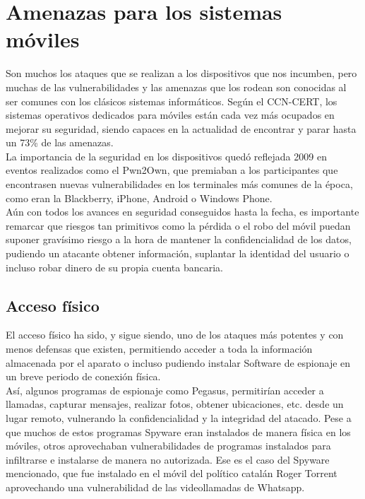 \documentclass[11pt]{article}
\begin{document}
\section{Amenazas para los sistemas móviles}

{Son muchos los ataques que se realizan a los dispositivos que nos incumben, pero muchas de las vulnerabilidades y las amenazas que los rodean son conocidas al ser comunes con los clásicos sistemas informáticos. Según el CCN-CERT, los sistemas operativos dedicados para móviles están cada vez más ocupados en mejorar su seguridad, siendo capaces en la actualidad de encontrar y parar hasta un 73\% de las amenazas.} \\

{La importancia de la seguridad en los dispositivos quedó reflejada 2009 en eventos realizados como el Pwn2Own, que premiaban a los participantes que encontrasen nuevas vulnerabilidades en los terminales más comunes de la época, como eran la Blackberry, iPhone, Android o Windows Phone.} \\

{Aún con todos los avances en seguridad conseguidos hasta la fecha, es importante remarcar que riesgos tan primitivos como la pérdida o el robo del móvil puedan suponer gravísimo riesgo a la hora de mantener la confidencialidad de los datos, pudiendo un atacante obtener información, suplantar la identidad del usuario o incluso robar dinero de su propia cuenta bancaria.}

\subsection{Acceso físico}

{El acceso físico ha sido, y sigue siendo, uno de los ataques más potentes y con menos defensas que existen, permitiendo acceder a toda la información almacenada por el aparato o incluso pudiendo instalar Software de espionaje en un breve periodo de conexión física.} \\

{Así, algunos programas de espionaje como Pegasus, permitirían acceder a llamadas, capturar mensajes, realizar fotos, obtener ubicaciones, etc. desde un lugar remoto, vulnerando la confidencialidad y la integridad del atacado. Pese a que muchos de estos programas Spyware eran instalados de manera física en los móviles, otros aprovechaban vulnerabilidades de programas instalados para infiltrarse e instalarse de manera no autorizada. Ese es el caso del Spyware mencionado, que fue instalado en el móvil del político catalán Roger Torrent aprovechando una vulnerabilidad de las videollamadas de Whatsapp.} \\
\end{document}
